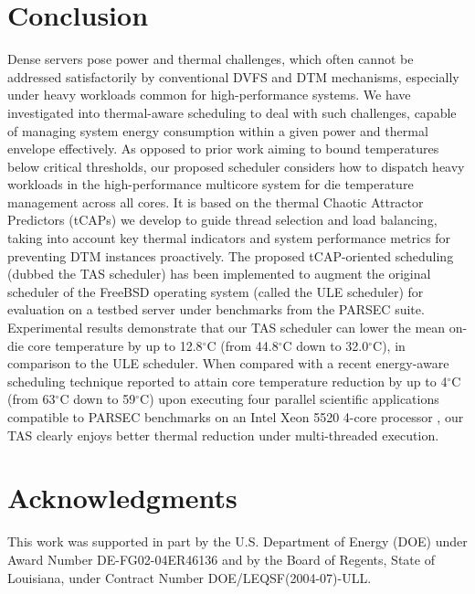 \documentclass[times, 10pt,twocolumn]{IEEEtran}
\begin{document}
\section{Conclusion}
\label{sec:conclusion}
Dense servers pose power and thermal challenges, which often cannot be
addressed satisfactorily by conventional DVFS and DTM mechanisms,
especially under heavy workloads common for high-performance systems.
We have investigated into thermal-aware scheduling to deal with such
challenges, capable of managing system energy consumption within a given
power and thermal envelope effectively.  As opposed to prior work aiming
to bound temperatures below critical thresholds, our proposed scheduler
considers how to dispatch heavy workloads in the high-performance
multicore system for die temperature management across all cores.  It
is based on the thermal Chaotic Attractor Predictors (tCAPs) we develop
to guide thread selection and load balancing, taking into account key
thermal indicators and system performance metrics for preventing DTM
instances proactively.  The proposed tCAP-oriented scheduling (dubbed
the TAS scheduler) has been implemented to augment the original
scheduler of the FreeBSD operating system (called the ULE scheduler) for
evaluation on a testbed server under benchmarks from the PARSEC suite.
Experimental results demonstrate that our TAS scheduler can lower the
mean on-die core temperature by up to 12.8$^{\circ}$C (from 44.8$^\circ$C
down to 32.0$^\circ$C), in comparison to the ULE
scheduler.  When compared with a recent energy-aware scheduling
technique reported to attain core temperature reduction by up to
4$^\circ$C (from 63$^\circ$C down to 59$^\circ$C) upon executing four
parallel scientific applications compatible to PARSEC benchmarks on an
Intel Xeon 5520 4-core processor \cite{Sarood2011}, our TAS clearly
enjoys better thermal reduction under multi-threaded execution.

\section*{Acknowledgments}
\label{sec:acknoledgements}
This work was supported in part by the U.S. Department of Energy (DOE)
under Award Number DE-FG02-04ER46136 and by the Board of Regents, State
of Louisiana, under Contract Number DOE/LEQSF(2004-07)-ULL.

\label{sec:references}
\begin{small}


\end{small}
\end{document}
